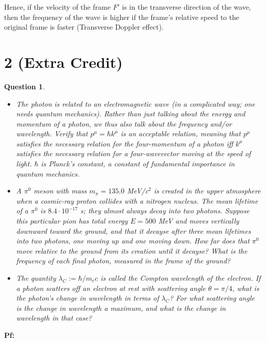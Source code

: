 \documentclass{article}
\newtheorem{question}{Question}
\begin{document}
Hence, if the velocity of the frame $F'$ is in the transverse direction of the wave, then the frequency of the wave is higher if the frame's relative speed to the original frame is faster (Transverse Doppler effect).

\break

\section*{2 (Extra Credit)}
\begin{question}\label{q2}
    
    \hfil

    \begin{itemize}
        \item[(a)] The photon is related to an electromagnetic wave (in a complicated way; one needs quantum mechanics). Rather than just talking about the energy and momentum of a photon, we thus also talk about the frequency and/or wavelength. Verify that $p^\mu=\hbar k^\mu$ is an acceptable relation, meaning that $p^\mu$ satisfies the necessary relation for the four-momentum of a photon iff $k^\mu$ satisfies the necessary relation for a four-wavevector moving at the speed of light. $\hbar$ is \emph{Planck's constant}, a constant of fundamental importance in quantum mechanics.
        \item[(b)] A $\pi^0$ meson with mass $m_\pi=135.0$ MeV/c$^2$ is created in the upper atmosphere when a cosmic-ray proton collides with a nitrogen nucleus. The mean lifetime of a $\pi^0$ is $8.4\cdot 10^{-17}$ s; they almost always decay into two photons. Suppose this particular pion has total energy $E=500$ MeV and moves vertically downward toward the ground, and that it decayse after three mean lifetimes into two photons, one moving up and one moving down. How far does that $\pi^0$ move relative to the ground from its creation until it decayse? What is the frequency of each final photon, measured in the frame of the ground?
        \item[(c)] The quantity $\lambda_C:=\hbar/m_ec$ is called the \emph{Compton wavelength} of the electron. If a photon scatters off an electron at rest with scattering angle $\theta=\pi/4$, what is the photon's change in wavelength in terms of $\lambda_C$? For what scattering angle is the change in wavelength a maximum, and what is the change in wavelength in that case? 
    \end{itemize}
\end{question}

\textbf{Pf:}
\end{document}
